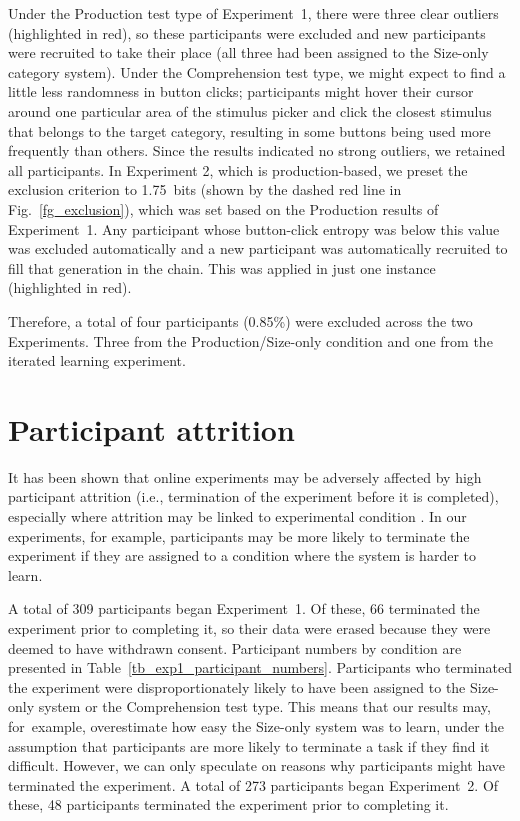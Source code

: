 \documentclass[a4paper, 11pt]{article}
\begin{document}
Under the Production test type of Experiment~1, there were three clear outliers (highlighted in red), so these participants were excluded and new participants were recruited to take their place (all three had been assigned to the Size-only category system). Under the Comprehension test type, we might expect to find a little less randomness in button clicks; participants might hover their cursor around one particular area of the stimulus picker and click the closest stimulus that belongs to the target category, resulting in some buttons being used more frequently than others. Since the results indicated no strong outliers, we retained all participants. In Experiment 2, which is production-based, we preset the exclusion criterion to 1.75~bits (shown by the dashed red line in Fig.~\ref{fg_exclusion}), which was set based on the Production results of Experiment~1. Any participant whose button-click entropy was below this value was excluded automatically and a new participant was automatically recruited to fill that generation in the chain. This was applied in just one instance (highlighted in red).

Therefore, a total of four participants (0.85\%) were excluded across the two Experiments. Three from the Production/Size-only condition and one from the iterated learning experiment.

\section{Participant attrition}

It has been shown that online experiments may be adversely affected by high participant attrition (i.e., termination of the experiment before it is completed), especially where attrition may be linked to experimental condition \citep{Zhou:2016}. In our experiments, for example, participants may be more likely to terminate the experiment if they are assigned to a condition where the system is harder to learn. 

A total of 309 participants began Experiment~1. Of these, 66 terminated the experiment prior to completing it, so their data were erased because they were deemed to have withdrawn consent. Participant numbers by condition are presented in Table~\ref{tb_exp1_participant_numbers}. Participants who terminated the experiment were disproportionately likely to have been assigned to the Size-only system or the Comprehension test type. This means that our results may, for~example, overestimate how easy the Size-only system was to learn, under the assumption that participants are more likely to terminate a task if they find it difficult. However, we can only speculate on reasons why participants might have terminated the experiment. A total of 273 participants began Experiment~2. Of these, 48 participants terminated the experiment prior to completing it.
\end{document}
